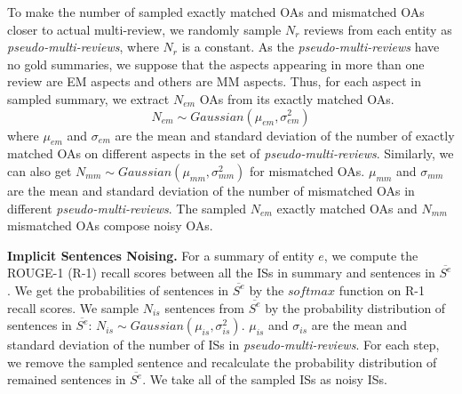 {To make the number of sampled exactly matched OAs and mismatched OAs closer to actual multi-review,
we randomly sample $N_r$ reviews from each entity
as {\em pseudo-multi-reviews}, 
where $N_r$ is a constant.
As the {\em pseudo-multi-reviews} have no gold summaries,
we suppose that the aspects appearing in more than one review are EM aspects
and others are MM aspects.
Thus, for each aspect in sampled summary, 
we extract $N_{em}$ OAs from its exactly matched OAs.
\begin{equation}
N_{em} \sim Gaussian(\mu_{em}, \sigma_{em}^2)
\end{equation}
where $\mu_{em}$ and $\sigma_{em}$ are the mean and standard deviation of
the number of exactly matched OAs on different aspects 
in the set of {\em pseudo-multi-reviews}.
Similarly, we can also get 
$N_{mm} \sim Gaussian(\mu_{mm}, \sigma_{mm}^2)$ 
for mismatched OAs.
$\mu_{mm}$ and $\sigma_{mm}$ are the mean and standard deviation of
the number of mismatched OAs in different {\em pseudo-multi-reviews}.
The sampled $N_{em}$ exactly matched OAs and $N_{mm}$ mismatched OAs compose noisy OAs.


\textbf{Implicit Sentences Noising.}
For a summary of entity $e$, 
we compute the ROUGE-1 (R-1) recall scores between all the ISs in summary
and sentences in $\overline{S^e}$.
We get the probabilities of sentences in $\overline{S^e}$
by the $softmax$ function on R-1 recall scores. 
We sample $N_{is}$ sentences from $\overline{S^e}$ by
the probability distribution of sentences in $\overline{S^e}$:
$N_{is} \sim Gaussian(\mu_{is}, \sigma_{is}^2)$.
$\mu_{is}$ and $\sigma_{is}$ are the mean and standard deviation of 
the number of ISs in {\em pseudo-multi-reviews}.
For each step, we remove the sampled sentence and recalculate the probability distribution of remained sentences in $\overline{S^e}$.
We take all of the sampled ISs as noisy ISs.

}
